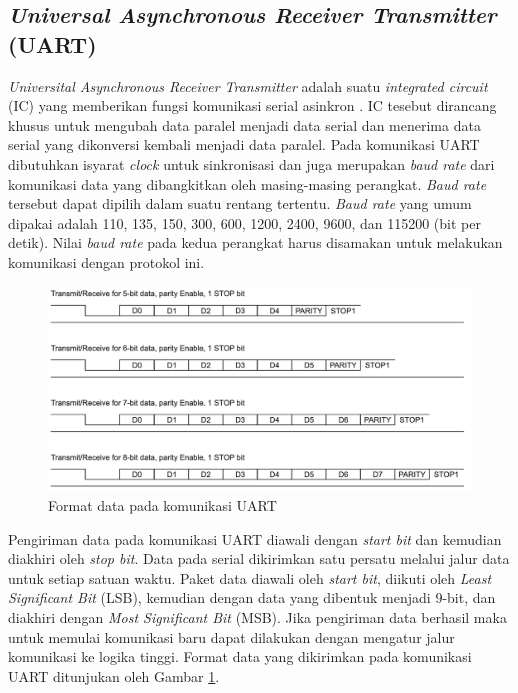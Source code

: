 \subsection{\textit{Universal Asynchronous Receiver Transmitter} (UART)}
\textit{Universital Asynchronous Receiver Transmitter} adalah suatu \textit{integrated circuit} (IC) yang memberikan fungsi komunikasi serial asinkron \cite{ti2010}. IC tesebut dirancang khusus untuk mengubah data paralel menjadi data serial dan menerima data serial yang dikonversi kembali menjadi data paralel. Pada komunikasi UART dibutuhkan isyarat \textit{clock} untuk sinkronisasi dan juga merupakan \textit{baud rate} dari komunikasi data yang dibangkitkan oleh masing-masing perangkat. \textit{Baud rate} tersebut dapat dipilih dalam suatu rentang tertentu. \textit{Baud rate} yang umum dipakai adalah 110, 135, 150, 300, 600, 1200, 2400, 9600, dan 115200 (bit per detik). Nilai \textit{baud rate} pada kedua perangkat harus disamakan untuk melakukan komunikasi dengan protokol ini.

\begin{figure}[H]
	\centering
	\includegraphics[width=12cm]{contents/chapter-2/uart-format.png}
	\caption{Format data pada komunikasi UART \cite{ti2010}}
	\label{Fig: uart-format}
\end{figure}

 Pengiriman data pada komunikasi UART diawali dengan \textit{start bit} dan kemudian diakhiri oleh \textit{stop bit}. Data pada serial dikirimkan satu persatu melalui jalur data untuk setiap satuan waktu. Paket data diawali oleh \textit{start bit}, diikuti oleh \textit{Least Significant Bit} (LSB), kemudian dengan data yang dibentuk menjadi 9-bit, dan diakhiri dengan \textit{Most Significant Bit} (MSB). Jika pengiriman data berhasil maka untuk memulai komunikasi baru dapat dilakukan dengan mengatur jalur komunikasi ke logika tinggi. Format data yang dikirimkan pada komunikasi UART ditunjukan oleh Gambar \ref{Fig: uart-format}.

